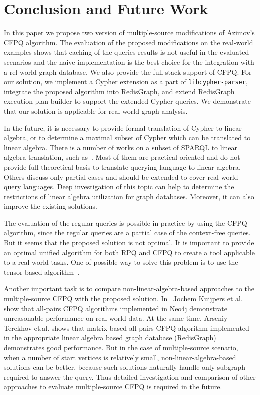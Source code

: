 \section{Conclusion and Future Work}
In this paper we propose two version of multiple-source modifications of Azimov's CFPQ algorithm.
The evaluation of the proposed modifications on the real-world examples shows that caching of the queries results is not useful in the evaluated scenarios and the naive implementation is the best choice for the integration with a rel-world graph database.
We also provide the full-stack support of CFPQ.
For our solution, we implement a Cypher extension as a part of \texttt{libcypher-parser}, integrate the proposed algorithm into RedisGraph, and extend RedisGraph execution plan builder to support the extended Cypher queries.
We demonstrate that our solution is applicable for real-world graph analysis.

In the future, it is necessary to provide formal translation of Cypher to linear algebra, or to determine a maximal subset of Cypher which can be translated to linear algebra.
There is a number of works on a subset of SPARQL to linear algebra translation, such as~\cite{10.14778/3229863.3236239,10.1007/978-3-642-34002-4_36,10.1145/3302424.3303962,DBLP:journals/corr/MetzlerM15a}.
Most of them are practical-oriented and do not provide full theoretical basis to translate querying language to linear algebra.
Others discuss only partial cases and should be extended to cover real-world query languages.
Deep investigation of this topic can help to determine the restrictions of linear algebra utilization for graph databases.
Moreover, it can also improve the existing solutions.

The evaluation of the regular queries is possible in practice by using the CFPQ algorithm, since the regular queries are a partial case of the context-free queries.
But it seems that the proposed solution is not optimal.
It is important to provide an optimal unified algorithm for both RPQ and CFPQ to create a tool applicable to a real-world tasks.
One of possible way to solve this problem is to use the tensor-based algorithm~\cite{10.1007/978-3-030-54832-2_6}.

Another important task is to compare non-linear-algebra-based approaches to the multiple-source CFPQ with the proposed solution.
In~\cite{Kuijpers:2019:ESC:3335783.3335791} Jochem Kuijpers et al. show that all-pairs CFPQ algorithms implemented in Neo4j demonstrate unreasonable performance on real-world data.
At the same time, Arseniy Terekhov et.al. shows that matrix-based all-pairs CFPQ algorithm implemented in the appropriate linear algebra based graph database (RedisGraph) demonstrates good performance.
But in the case of multiple-source scenario, when a number of start vertices is relatively small, non-linear-algebra-based solutions can be better, because such solutions naturally handle only subgraph required to answer the query.
Thus detailed investigation and comparison of other approaches to evaluate multiple-source CFPQ is required in the future.